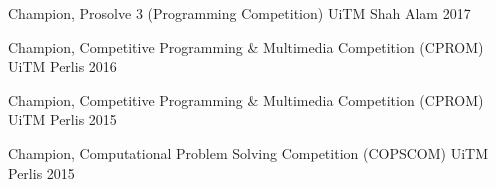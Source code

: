 
\begin{cvhonors}

  \cvhonor
    {Champion,}
    {Prosolve 3 (Programming Competition)}
    {UiTM Shah Alam}
    {2017}

  \cvhonor
    {Champion,}
    {Competitive Programming \& Multimedia Competition (CPROM)}
    {UiTM Perlis}
    {2016}

  \cvhonor
    {Champion,}
    {Competitive Programming \& Multimedia Competition (CPROM)}
    {UiTM Perlis}
    {2015}

  \cvhonor
    {Champion,}
    {Computational Problem Solving Competition (COPSCOM)}
    {UiTM Perlis}
    {2015}

\end{cvhonors}
\pagebreak
